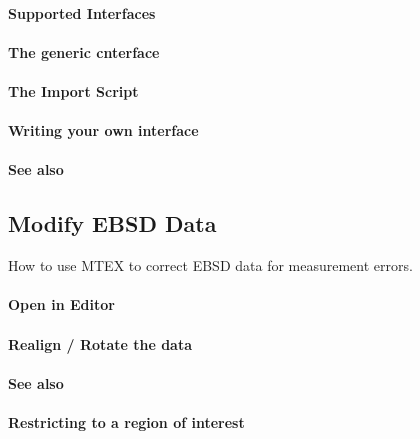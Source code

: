 \documentclass{article}
\begin{document}
			\paragraph{Supported Interfaces}
		
			\paragraph{The generic cnterface}
		
			\paragraph{The Import Script}
		
			\paragraph{Writing your own interface}
		
			\paragraph{See also}
		
		\subsection{Modify EBSD Data}

		
                     \begin{par}
How to use MTEX to correct EBSD data for measurement errors.
\end{par} \vspace{1em}

                  
			\paragraph{Open in Editor}
		
			\paragraph{Realign / Rotate the data}
		
			\paragraph{See also}
		
			\paragraph{Restricting to a region of interest}
		
\end{document}
